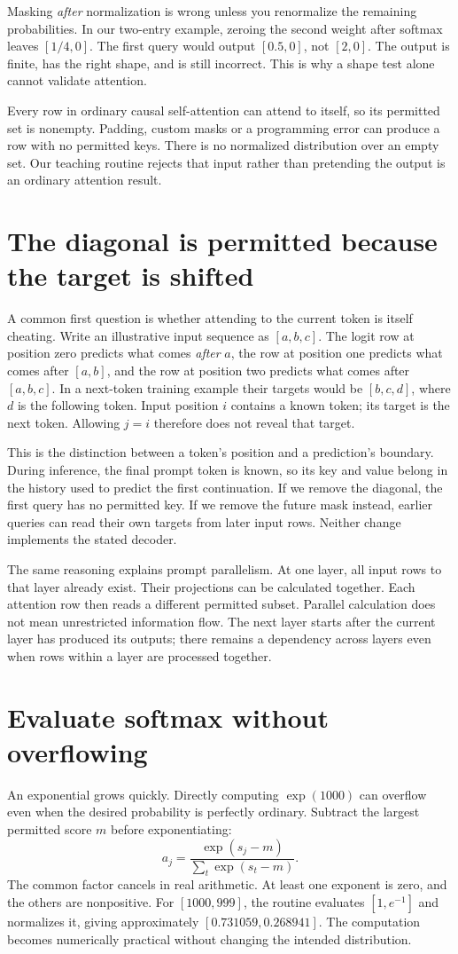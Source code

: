 Masking \emph{after} normalization is wrong unless you renormalize the
remaining probabilities. In our two-entry example, zeroing the second
weight after softmax leaves $[1/4,0]$. The first query would output
$[0.5,0]$, not $[2,0]$. The output is finite, has the right shape, and is
still incorrect. This is why a shape test alone cannot validate attention.

Every row in ordinary causal self-attention can attend to itself, so its
permitted set is nonempty. Padding, custom masks or a programming error can
produce a row with no permitted keys. There is no normalized distribution
over an empty set. Our teaching routine rejects that input rather than
pretending the output is an ordinary attention result.

\section{The diagonal is permitted because the target is shifted}
A common first question is whether attending to the current token is itself
cheating. Write an illustrative input sequence as $[a,b,c]$. The logit row
at position zero predicts what comes \emph{after} $a$, the row at position
one predicts what comes after $[a,b]$, and the row at position two predicts
what comes after $[a,b,c]$. In a next-token training example their targets
would be $[b,c,d]$, where $d$ is the following token. Input position $i$
contains a known token; its target is the next token. Allowing $j=i$
therefore does not reveal that target.

This is the distinction between a token's position and a prediction's
boundary. During inference, the final prompt token is known, so its key
and value belong in the history used to predict the first continuation.
If we remove the diagonal, the first query has no permitted key. If we
remove the future mask instead, earlier queries can read their own targets
from later input rows. Neither change implements the stated decoder.

The same reasoning explains prompt parallelism. At one layer, all input
rows to that layer already exist. Their projections can be calculated
together. Each attention row then reads a different permitted subset.
Parallel calculation does not mean unrestricted information flow.
The next layer starts after the current layer has produced its outputs;
there remains a dependency across layers even when rows within a layer
are processed together.

\section{Evaluate softmax without overflowing}
An exponential grows quickly. Directly computing $\exp(1000)$ can overflow
even when the desired probability is perfectly ordinary. Subtract the
largest permitted score $m$ before exponentiating:
\[
 a_j=\frac{\exp(s_j-m)}{\sum_t\exp(s_t-m)}.
\]
The common factor cancels in real arithmetic. At least one exponent is
zero, and the others are nonpositive. For $[1000,999]$, the routine
evaluates $[1,e^{-1}]$ and normalizes it, giving approximately
$[0.731059,0.268941]$. The computation becomes numerically practical
without changing the intended distribution.


